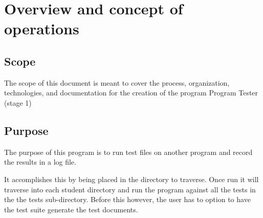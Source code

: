
\chapter{Overview and concept of operations}



\section{Scope}
The scope of this document is meant to cover the process, organization,
technologies, and documentation for the creation of the program
Program Tester (stage 1)

\section{Purpose}
The purpose of this program is to run test files on another
 program and record the results in a log file.

It accomplishes this by being placed in the directory to traverse. Once run it will traverse into each student directory and run the program against all the tests in the the tests sub-directory. Before this however, the user has to option to have the test suite generate the test documents.




